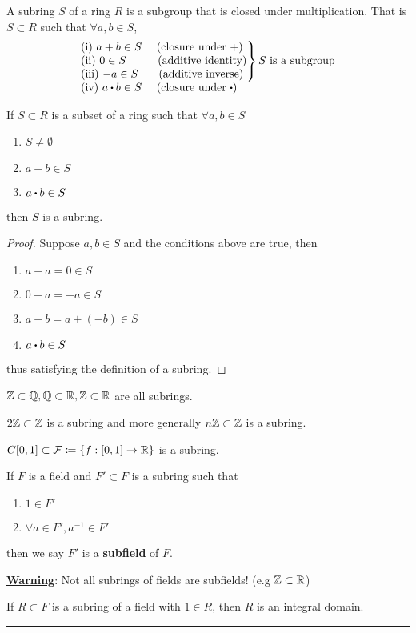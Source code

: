 \documentclass[../Main.tex]{subfiles}
\begin{document}
\begin{dfn}[title=Subring]
	A subring $S$ of a ring $R$ is a subgroup that is closed under multiplication. That is $S\subset R$ such that $\forall a,b \in S$,
	 \[\begin{tabular}{ l }
		$\left.\kern-\nulldelimiterspace
		\begin{tabular}{@{} l @{}}
		(i) $a + b \in S$ \quad (closure under $+$) \\
		(ii) $0 \in S$ \qquad\, (additive identity)                               \\
		(iii) $-a \in S$ \quad\, (additive inverse)
		\end{tabular}\right\} S \text{ is a subgroup}$ \\
		(iv) $a \rdot b \in S$ \quad  (closure under $\rdot$)
	\end{tabular}\]
\end{dfn}
\begin{prop}[title=Subgroup Criterion]
	If $S\subset R$ is a subset of a ring such that $\forall a,b \in S$ 
	\begin{enumerate}
		\item $S \ne \emptyset$
		\item $a-b \in S$
		\item $a\rdot b \in S$
	\end{enumerate}
	then $S$ is a subring.
\end{prop}
\begin{proof}
	Suppose $a,b\in S$ and the conditions above are true, then
	\begin{enumerate}
		\item $a-a=0\in S$
		\item $0-a=-a\in S$
		\item $a-b = a+(-b) \in S$
		\item $a\rdot b \in S$
	\end{enumerate}
	thus satisfying the definition of a subring.
\end{proof}
\begin{example}
	$\mathbb{Z} \subset \mathbb{Q}, \mathbb{Q} \subset \mathbb{R}, \mathbb{Z} \subset \mathbb{R}$ are all subrings.
\end{example}
\begin{example}
	$2\mathbb{Z} \subset \mathbb{Z}$ is a subring and more generally $n\mathbb{Z} \subset \mathbb{Z}$ is a subring.
\end{example}
\begin{example}
	$C[0,1] \subset \mathcal{F} \coloneqq \{f: [0,1]\to \mathbb{R}\}$ is a subring.
\end{example}
\begin{dfn}[title=Subfield]
	If $F$ is a field and $F' \subset F$ is a subring such that
	\begin{enumerate}
		\item $1 \in F'$
		\item $\forall a \in F', a^{-1} \in F'$
	\end{enumerate}
	then we say $F'$ is a \textbf{subfield} of $F$.
\end{dfn}
\textbf{\textcolor{BrickRed}{\underline{Warning}}}: Not all subrings of fields are subfields! (e.g $\mathbb{Z}\subset \mathbb{R}$)
\begin{claim}
	If $R \subset F$ is a subring of a field with $1\in R$, then $R$ is an integral domain.
\end{claim}
\noindent\rule{\textwidth}{1pt}
\end{document}
